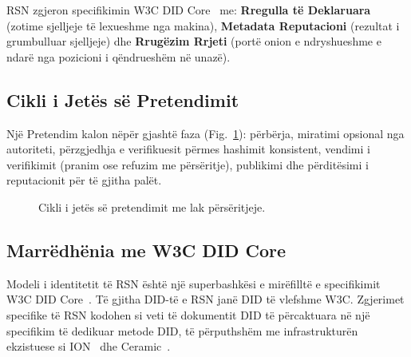 \documentclass[11pt,a4paper,twocolumn]{article}
\begin{document}
RSN zgjeron specifikimin W3C DID Core~\cite{did2022} me: \textbf{Rregulla të Deklaruara} (zotime sjelljeje të lexueshme nga makina), \textbf{Metadata Reputacioni} (rezultat i grumbulluar sjelljeje) dhe \textbf{Rrugëzim Rrjeti} (portë onion e ndryshueshme e ndarë nga pozicioni i qëndrueshëm në unazë).

\subsection{Cikli i Jetës së Pretendimit}

Një Pretendim kalon nëpër gjashtë faza (Fig.~\ref{fig:lifecycle}): përbërja, miratimi opsional nga autoriteti, përzgjedhja e verifikuesit përmes hashimit konsistent, vendimi i verifikimit (pranim ose refuzim me përsëritje), publikimi dhe përditësimi i reputacionit për të gjitha palët.

\begin{figure}[ht]
\centering
{}
\caption{Cikli i jetës së pretendimit me lak përsëritjeje.}
\label{fig:lifecycle}
\end{figure}

\subsection{Marrëdhënia me W3C DID Core}

Modeli i identitetit të RSN është një superbashkësi e mirëfilltë e specifikimit W3C DID Core~\cite{did2022}. Të gjitha DID-të e RSN janë DID të vlefshme W3C. Zgjerimet specifike të RSN kodohen si veti të dokumentit DID të përcaktuara në një specifikim të dedikuar metode DID, të përputhshëm me infrastrukturën ekzistuese si ION~\cite{buchner2021} dhe Ceramic~\cite{ceramic2023}.
\end{document}
